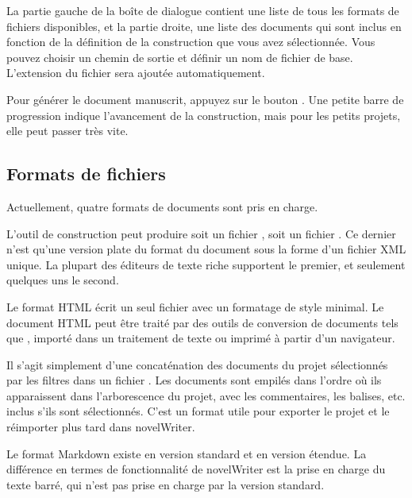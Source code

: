 \documentclass[a4paper,11pt,french]{sphinxmanual}
\begin{document}
\sphinxAtStartPar
La partie gauche de la boîte de dialogue contient une liste de tous les formats de fichiers disponibles, et la partie droite, une liste des documents qui sont inclus en fonction de la définition de la construction que vous avez sélectionnée. Vous pouvez choisir un chemin de sortie et définir un nom de fichier de base. L’extension du fichier sera ajoutée automatiquement.

\sphinxAtStartPar
Pour générer le document manuscrit, appuyez sur le bouton . Une petite barre de progression indique l’avancement de la construction, mais pour les petits projets, elle peut passer très vite.


\subsection{Formats de fichiers}
\label{\detokenize{project_manuscript:file-formats}}
\sphinxAtStartPar
Actuellement, quatre formats de documents sont pris en charge.
\begin{description}
\sphinxAtStartPar
L’outil de construction peut produire soit un fichier , soit un fichier . Ce dernier n’est qu’une version plate du format du document sous la forme d’un fichier XML unique. La plupart des éditeurs de texte riche supportent le premier, et seulement quelques uns le second.

\sphinxAtStartPar
Le format HTML écrit un seul fichier  avec un formatage de style minimal. Le document HTML peut être traité par des outils de conversion de documents tels que , importé dans un traitement de texte ou imprimé à partir d’un navigateur.

\sphinxAtStartPar
Il s’agit simplement d’une concaténation des documents du projet sélectionnés par les filtres dans un fichier . Les documents sont empilés dans l’ordre où ils apparaissent dans l’arborescence du projet, avec les commentaires, les balises, etc. inclus s’ils sont sélectionnés. C’est un format utile pour exporter le projet et le réimporter plus tard dans novelWriter.

\sphinxAtStartPar
Le format Markdown existe en version standard et en version étendue. La  différence en termes de fonctionnalité de novelWriter est la prise en charge du texte barré, qui n’est pas prise en charge par la version standard.

\end{description}
\end{document}
